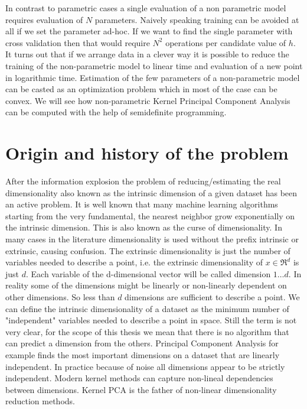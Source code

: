 \documentclass[12pt,letterpaper,doublespaced,ETD,dvips,proposal]{gtthesis}
\begin{document}
\begin{Body}

In contrast to parametric cases a single evaluation of a non
parametric model requires evaluation of $N$ parameters. Naively
speaking training can be avoided at all if we set the parameter
ad-hoc. If we want to find the single parameter with cross
validation then that would require $N^2$ operations per candidate
value of $h$. It turns out that if we arrange data in a clever way
it is possible to reduce the training of the non-parametric model to
linear time and evaluation of a new point in logarithmic time.
Estimation of the few parameters of a non-parametric model can be
casted as an optimization problem which in most of the case can be
convex. We will see how non-parametric Kernel Principal Component
Analysis can be computed with the help of semidefinite programming.

\section{Origin and history of the problem}
\label{origin}

After the information explosion the problem of reducing/estimating
the real dimensionality also known as the intrinsic dimension of a
given dataset has been an active problem. It is well known that many
machine learning algorithms starting from the very fundamental, the
nearest neighbor grow exponentially on the intrinsic dimension. This
is also known as the curse of dimensionality. In many cases in the
literature dimensionality is used without the prefix intrinsic or
extrinsic, causing confusion. The extrinsic dimensionality is just
the number of variables needed to describe a point, i.e. the
extrinsic dimensionality of $x\in \Re^d$ is just $d$. Each variable
of the d-dimensional vector will be called dimension $1\dots d$. In
reality some of the dimensions might be linearly or non-linearly
dependent on other dimensions. So less than $d$ dimensions are
sufficient to describe a point. We can define the intrinsic
dimensionality of a dataset as the minimum number of "independent"
variables needed to describe a point in space. Still the term is not
very clear, for the scope of this thesis we mean that there is no
algorithm that can predict a dimension from the others. Principal
Component Analysis for example finds the most important dimensions
on a dataset that are linearly independent. In practice because of
noise all dimensions appear to be strictly independent.  Modern
kernel methods can capture non-lineal dependencies between
dimensions. Kernel PCA is the father of non-linear dimensionality
reduction methods.


\end{Body}
\end{document}
